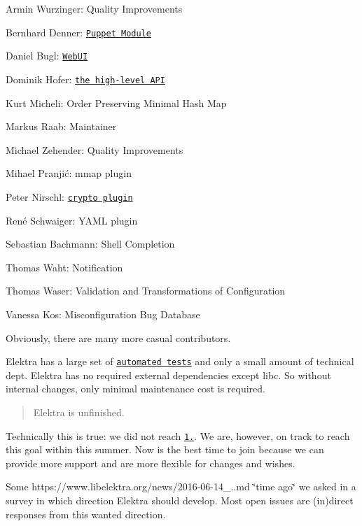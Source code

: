 \begin{DoxyItemize}
\item Armin Wurzinger\+: Quality Improvements
\item Bernhard Denner\+: \href{https://github.com/ElektraInitiative/puppet-libelektra}{\tt Puppet Module}
\item Daniel Bugl\+: \href{https://www.libelektra.org/tools/web}{\tt Web\+UI}
\item Dominik Hofer\+: \href{https://www.libelektra.org/decisions/high-level-api}{\tt the high-\/level A\+PI}
\item Kurt Micheli\+: Order Preserving Minimal Hash Map
\item Markus Raab\+: Maintainer
\item Michael Zehender\+: Quality Improvements
\item Mihael Pranjić\+: mmap plugin
\item Peter Nirschl\+: \href{https://www.libelektra.org/plugins/crypto}{\tt crypto plugin}
\item René Schwaiger\+: Y\+A\+ML plugin
\item Sebastian Bachmann\+: Shell Completion
\item Thomas Waht\+: Notification
\item Thomas Waser\+: Validation and Transformations of Configuration
\item Vanessa Kos\+: Misconfiguration Bug Database
\end{DoxyItemize}

Obviously, there are many more casual contributors.

Elektra has a large set of \href{https://build.libelektra.org}{\tt automated tests} and only a small amount of technical dept. Elektra has no required external dependencies except libc. So without internal changes, only minimal maintenance cost is required.

\begin{quote}
Elektra is unfinished. \end{quote}


Technically this is true\+: we did not reach \href{https://git.libelektra.org/milestone/12}{\tt 1.}. We are, however, on track to reach this goal within this summer. Now is the best time to join because we can provide more support and are more flexible for changes and wishes.

Some https\+://www.libelektra.\+org/news/2016-\/06-\/14\+\_..\+md \char`\"{}time ago\char`\"{} we asked in a survey in which direction Elektra should develop. Most open issues are (in)direct responses from this wanted direction.

